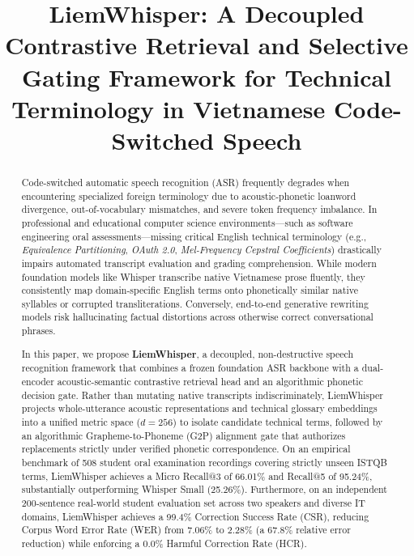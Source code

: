\documentclass[11pt,conference,onecolumn]{IEEEtran}
\begin{document}
\title{LiemWhisper: A Decoupled Contrastive Retrieval and Selective Gating Framework for Technical Terminology in Vietnamese Code-Switched Speech}

\author{
}

\maketitle

\begin{abstract}
Code-switched automatic speech recognition (ASR) frequently degrades when encountering specialized foreign terminology due to acoustic-phonetic loanword divergence, out-of-vocabulary mismatches, and severe token frequency imbalance. In professional and educational computer science environments---such as software engineering oral assessments---missing critical English technical terminology (e.g., \textit{Equivalence Partitioning}, \textit{OAuth 2.0}, \textit{Mel-Frequency Cepstral Coefficients}) drastically impairs automated transcript evaluation and grading comprehension. While modern foundation models like Whisper transcribe native Vietnamese prose fluently, they consistently map domain-specific English terms onto phonetically similar native syllables or corrupted transliterations. Conversely, end-to-end generative rewriting models risk hallucinating factual distortions across otherwise correct conversational phrases. 

In this paper, we propose \textbf{LiemWhisper}, a decoupled, non-destructive speech recognition framework that combines a frozen foundation ASR backbone with a dual-encoder acoustic-semantic contrastive retrieval head and an algorithmic phonetic decision gate. Rather than mutating native transcripts indiscriminately, LiemWhisper projects whole-utterance acoustic representations and technical glossary embeddings into a unified metric space ($d=256$) to isolate candidate technical terms, followed by an algorithmic Grapheme-to-Phoneme (G2P) alignment gate that authorizes replacements strictly under verified phonetic correspondence. On an empirical benchmark of 508 student oral examination recordings covering strictly unseen ISTQB terms, LiemWhisper achieves a Micro Recall@3 of 66.01\% and Recall@5 of 95.24\%, substantially outperforming Whisper Small (25.26\%). Furthermore, on an independent 200-sentence real-world student evaluation set across two speakers and diverse IT domains, LiemWhisper achieves a 99.4\% Correction Success Rate (CSR), reducing Corpus Word Error Rate (WER) from 7.06\% to 2.28\% (a 67.8\% relative error reduction) while enforcing a 0.0\% Harmful Correction Rate (HCR).
\end{abstract}
\end{document}
